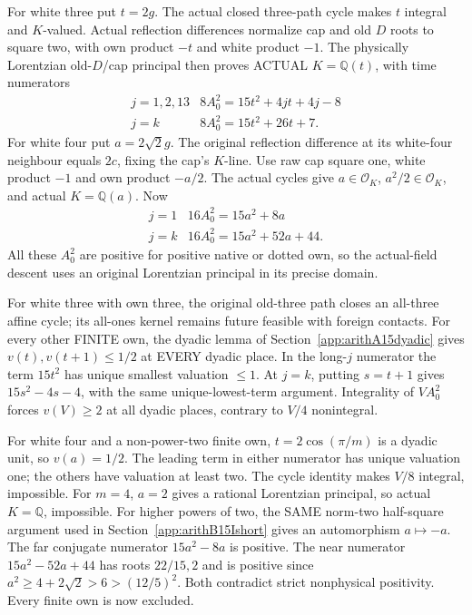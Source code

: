 \documentclass[11pt]{article}
\begin{document}
For white three put \(t=2g\).
The actual closed three-path cycle makes \(t\)
integral and \(K\)-valued.
Actual reflection differences normalize cap and old
\(D\) roots to square two, with own product \(-t\)
and white product \(-1\).
The physically Lorentzian old-\(D\)/cap principal
then proves ACTUAL \(K=\mathbb Q(t)\), with time
numerators
\[
 \begin{array}{c|c}
 j=1,2,13&8A_0^2=15t^2+4jt+4j-8\\
 j=k&8A_0^2=15t^2+26t+7 .
 \end{array}
\]
For white four put \(a=2\sqrt2g\).
The original reflection difference at its white-four
neighbour equals \(2c\), fixing the cap's \(K\)-line.
Use raw cap square one, white product \(-1\)
and own product \(-a/2\).
The actual cycles give \(a\in\mathcal O_K\),
\(a^2/2\in\mathcal O_K\), and actual \(K=\mathbb Q(a)\).
Now
\[
 \begin{array}{c|c}
 j=1&16A_0^2=15a^2+8a\\
 j=k&16A_0^2=15a^2+52a+44 .
 \end{array}
\]
All these \(A_0^2\) are positive for positive native
or dotted own, so the actual-field descent uses
an original Lorentzian principal in its precise domain.

For white three with own three, the original old-three
path closes an all-three affine cycle; its all-ones
kernel remains future feasible with foreign contacts.
For every other FINITE own, the dyadic lemma of
Section~\ref{app:arithA15dyadic} gives
\(v(t),v(t+1)\le1/2\) at EVERY dyadic place.
In the long-\(j\) numerator the term \(15t^2\)
has unique smallest valuation \(\le1\).
At \(j=k\), putting \(s=t+1\) gives
\(15s^2-4s-4\), with the same unique-lowest-term
argument.
Integrality of \(VA_0^2\) forces \(v(V)\ge2\)
at all dyadic places, contrary to \(V/4\) nonintegral.

For white four and a non-power-two finite own,
\(t=2\cos(\pi/m)\) is a dyadic unit,
so \(v(a)=1/2\).
The leading term in either numerator has unique
valuation one; the others have valuation at least two.
The cycle identity makes \(V/8\) integral, impossible.
For \(m=4\), \(a=2\) gives a rational Lorentzian
principal, so actual \(K=\mathbb Q\), impossible.
For higher powers of two, the SAME norm-two
half-square argument used in
Section~\ref{app:arithB15Ishort} gives an
automorphism \(a\mapsto-a\).
The far conjugate numerator \(15a^2-8a\) is positive.
The near numerator \(15a^2-52a+44\) has roots
\(22/15,2\) and is positive since
\(a^2\ge4+2\sqrt2>6>(12/5)^2\).
Both contradict strict nonphysical positivity.
Every finite own is now excluded.
\end{document}
